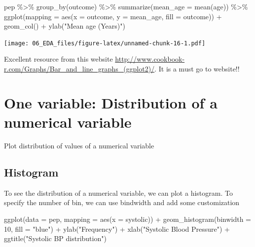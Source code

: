 \documentclass[
  10pt,
]{krantz}
\newenvironment{Shaded}{\begin{snugshade}}{\end{snugshade}}
\newcommand{\AttributeTok}[1]{\textcolor[rgb]{0.77,0.63,0.00}{#1}}
\newcommand{\DecValTok}[1]{\textcolor[rgb]{0.00,0.00,0.81}{#1}}
\newcommand{\FunctionTok}[1]{\textcolor[rgb]{0.00,0.00,0.00}{#1}}
\newcommand{\NormalTok}[1]{#1}
\newcommand{\SpecialCharTok}[1]{\textcolor[rgb]{0.00,0.00,0.00}{#1}}
\newcommand{\StringTok}[1]{\textcolor[rgb]{0.31,0.60,0.02}{#1}}
\begin{document}
\begin{Shaded}
\begin{Highlighting}[]
\NormalTok{pep }\SpecialCharTok{\%\textgreater{}\%} \FunctionTok{group\_by}\NormalTok{(outcome) }\SpecialCharTok{\%\textgreater{}\%} 
  \FunctionTok{summarize}\NormalTok{(}\AttributeTok{mean\_age =} \FunctionTok{mean}\NormalTok{(age)) }\SpecialCharTok{\%\textgreater{}\%} 
  \FunctionTok{ggplot}\NormalTok{(}\AttributeTok{mapping =} \FunctionTok{aes}\NormalTok{(}\AttributeTok{x =}\NormalTok{ outcome, }\AttributeTok{y =}\NormalTok{ mean\_age, }\AttributeTok{fill =}\NormalTok{ outcome)) }\SpecialCharTok{+} 
  \FunctionTok{geom\_col}\NormalTok{() }\SpecialCharTok{+}
  \FunctionTok{ylab}\NormalTok{(}\StringTok{"Mean age (Years)"}\NormalTok{)}
\end{Highlighting}
\end{Shaded}

\texttt{[image: 06\_EDA\_files/figure-latex/unnamed-chunk-16-1.pdf]}

Excellent resource from this website \url{http://www.cookbook-r.com/Graphs/Bar_and_line_graphs_(ggplot2)/}. It is a must go to website!!

\hypertarget{one-variable-distribution-of-a-numerical-variable}{%
\section{\texorpdfstring{One variable: Distribution of a numerical variable}{One variable: Distribution of a numerical variable}}\label{one-variable-distribution-of-a-numerical-variable}}

Plot distribution of values of a numerical variable

\hypertarget{histogram}{%
\subsection{\texorpdfstring{Histogram}{Histogram}}\label{histogram}}

To see the distribution of a numerical variable, we can plot a histogram. To specify the number of bin, we can use bindwidth and add some customization

\begin{Shaded}
\begin{Highlighting}[]
\FunctionTok{ggplot}\NormalTok{(}\AttributeTok{data =}\NormalTok{ pep, }\AttributeTok{mapping =} \FunctionTok{aes}\NormalTok{(}\AttributeTok{x =}\NormalTok{ systolic)) }\SpecialCharTok{+} 
  \FunctionTok{geom\_histogram}\NormalTok{(}\AttributeTok{binwidth =} \DecValTok{10}\NormalTok{, }\AttributeTok{fill =} \StringTok{"blue"}\NormalTok{) }\SpecialCharTok{+}
  \FunctionTok{ylab}\NormalTok{(}\StringTok{"Frequency"}\NormalTok{) }\SpecialCharTok{+}
  \FunctionTok{xlab}\NormalTok{(}\StringTok{"Systolic Blood Pressure"}\NormalTok{) }\SpecialCharTok{+}
  \FunctionTok{ggtitle}\NormalTok{(}\StringTok{"Systolic BP distribution"}\NormalTok{)}
\end{Highlighting}
\end{Shaded}
\end{document}
